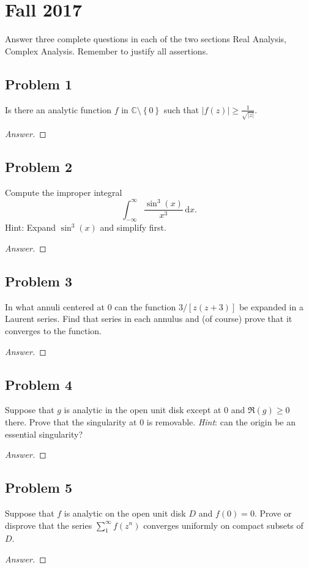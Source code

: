 \documentclass[12pt]{article}
\newcommand{\cx}{\mathbb{C}}
\newcommand{\ita}[1]{\textit{#1}}
\newcommand\setb[1]{\left \{ #1 \right \}}
\newcommand{\abs}[1]{\left| #1 \right|}
\renewcommand{\i}[4]{\int_{#1}^{#2} {#3} \, \mathrm{d} {#4} }
\theoremstyle{definition}
\begin{document}
\newpage 
\section{Fall 2017}
Answer three complete questions in each of the two sections Real Analysis, Complex Analysis. Remember to justify all assertions. 

\subsection{Problem 1}
Is there an analytic function $f$ in $\cx \setminus \setb{ 0 }$ such that $\abs{ f(z) } \geq \frac{1}{\sqrt{\abs{z}}}$. 
\begin{proof}[Answer]
    
\end{proof}

\subsection{Problem 2}
Compute the improper integral 
\[
    \i{-\infty}{\infty}{ \frac{\sin^3(x)}{x^3} }{x} . 
\]
Hint: Expand $\sin^3(x)$ and simplify first. 
\begin{proof}[Answer]
    
\end{proof}

\subsection{Problem 3}
In what annuli centered at $0$ can the function $3/[z(z+3)]$ be expanded in a Laurent series. Find that series in each annulus and (of course) prove that it converges to the function. 
\begin{proof}[Answer]
    
\end{proof}

\subsection{Problem 4}
Suppose that $g$ is analytic in the open unit disk except at $0$ and $\Re(g) \geq 0$ there. Prove that the singularity at $0$ is removable. \ita{Hint}: can the origin be an essential singularity?
\begin{proof}[Answer]
    
\end{proof}

\subsection{Problem 5}
Suppose that $f$ is analytic on the open unit disk $D$ and $f(0) = 0$. Prove or disprove that the series $\sum_1^{\infty} f (z^n)$ converges uniformly on compact subsets of $D$.
\begin{proof}[Answer]
    
\end{proof}
\end{document}
